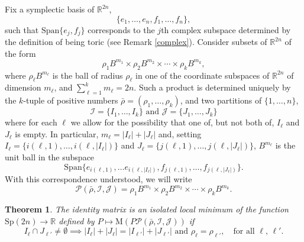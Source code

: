 \documentclass[12pt]{amsart}
\newtheorem{theorem}{Theorem}[section]
\newtheorem{corollary}[theorem]{Corollary}
\theoremstyle{definition}
\newcommand{\RR}{{\mathbb R}}
\newcommand{\mw}{{{\mathrm {M}}}}
\begin{document}
Fix a symplectic basis  of $\RR^{2n}$, $$\{e_1, \dots, e_n, f_1, \dots, f_n\},$$ such that $\mathrm{Span}\{e_j,f_j\}$ corresponds to the $j$th complex subspace determined by the definition of being toric (see Remark \ref{complex}). Consider subsets of $\RR^{2n}$ of the form 
\begin{equation*}\label{balls} \rho_1B^{m_1} \times \rho_2 B^{m_2} \times \cdots \times \rho_k B^{m_k},\end{equation*}
where $\rho_\ell B^{m_\ell}$ is the ball of radius $\rho_\ell$ in one of the coordinate subspaces of $\RR^{2n}$ of dimension $m_\ell$, and $\sum_{\ell=1}^k m_{\ell} =2n$. Such a product is determined uniquely by the $k$-tuple of positive numbers $\bar{\rho}=(\rho_1, \dots, \rho_k)$, and two partitions of $\{1, \dots, n\}$, $$\mathcal{I} =\{I_1, \dots, I_k\} \text{  and  }\mathcal{J}=\{J_1, \dots, J_k\}$$  where for each $\ell$ we allow for the possibility that one of, but not both of,  $I_\ell$ and $J_\ell$ is empty. In particular, $m_\ell = |I_{\ell}|+|J_{\ell}|$ and, 
setting $I_\ell= \{i(\ell,1), \dots, i(\ell,|I_\ell|)\}$ and  $J_\ell= \{j(\ell,1), \dots, j(\ell,|J_\ell|)\}$, $B^{m_\ell}$ is the unit ball in the subspace
$$\mathrm{Span}\{   e_{i(\ell,1)},\dots e_{i(\ell, |I_\ell|)},f_{j(\ell,1)}, \dots, f_{j(\ell, |J_\ell|)}   \}.$$
With this correspondence understood, we will write
$$\mathcal{P}(\bar{\rho},\mathcal{I},\mathcal{J}) = \rho_1B^{m_1} \times \rho_2 B^{m_2} \times \cdots \times \rho_k B^{m_k}.$$

\begin{theorem}\label{min}
The identity matrix is an isolated  local minimum of the function  $\mathrm{Sp}(2n) \to \RR$ defined by
$
 P \mapsto \mw(P \mathcal{P}(\bar{\rho},\mathcal{I},\mathcal{J}))
 $
if
\begin{equation}\label{cond}
      I_\ell \cap J_{\ell'} \neq \emptyset  \implies |I_\ell| + |J_\ell| = |I_{\ell'}| + |J_{\ell'}| \text{ and  } \rho_\ell=\rho_{\ell'} ,\quad \text{for all $\ell,\, \ell'$.}
    \end{equation}
\end{theorem}



\end{document}

